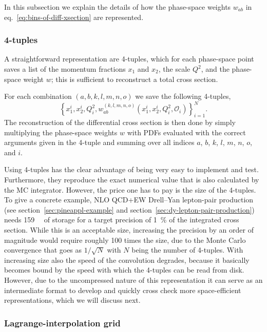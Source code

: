 In this subsection we explain the details of how the phase-space weights $w_{ab}$ in eq.~\eqref{eq:bins-of-diff-xsection} are represented.

\subsubsection{4-tuples}

A straightforward representation are 4-tuples, which for each phase-space point saves a list of the momentum fractions $x_1$ and $x_2$, the scale $Q^2$, and the phase-space weight $w$; this is sufficient to reconstruct a total cross section.

For each combination $(a,b,k,l,m,n,o)$ we save the following 4-tuples,
\begin{equation}
\left\{ x_1^i, x_2^i, Q^2_i, w^{(k,l,m,n,o)}_{ab} (x_1^i, x_2^i, Q^2_i, \mathcal{O}_i) \right\}_{i=1}^N \text{.} \label{eq:four-tuples}
\end{equation}
The reconstruction of the differential cross section is then done by simply multiplying the phase-space weights $w$ with PDFs evaluated with the correct arguments given in the 4-tuple and summing over all indices $a$, $b$, $k$, $l$, $m$, $n$, $o$, and $i$.

Using 4-tuples has the clear advantage of being very easy to implement and test.
Furthermore, they reproduce the exact numerical value that is also calculated by the MC integrator.
However, the price one has to pay is the size of the 4-tuples.
To give a concrete example, NLO QCD+EW Drell--Yan lepton-pair production (see section~\ref{sec:pineappl-example} and section~\ref{sec:dy-lepton-pair-production}) needs \SI{159}{\mega\byte} of storage for a target precision of \SI{1}{\percent} of the integrated cross section.
While this is an acceptable size, increasing the precision by an order of magnitude would require roughly 100 times the size, due to the Monte Carlo convergence that goes as $1/\sqrt{N}$ with $N$ being the number of 4-tuples.
With increasing size also the speed of the convolution degrades, because it basically becomes bound by the speed with which the 4-tuples can be read from disk.
However, due to the uncompressed nature of this representation it can serve as an intermediate format to develop and quickly cross check more space-efficient representations, which we will discuss next.

\subsubsection{Lagrange-interpolation grid}

